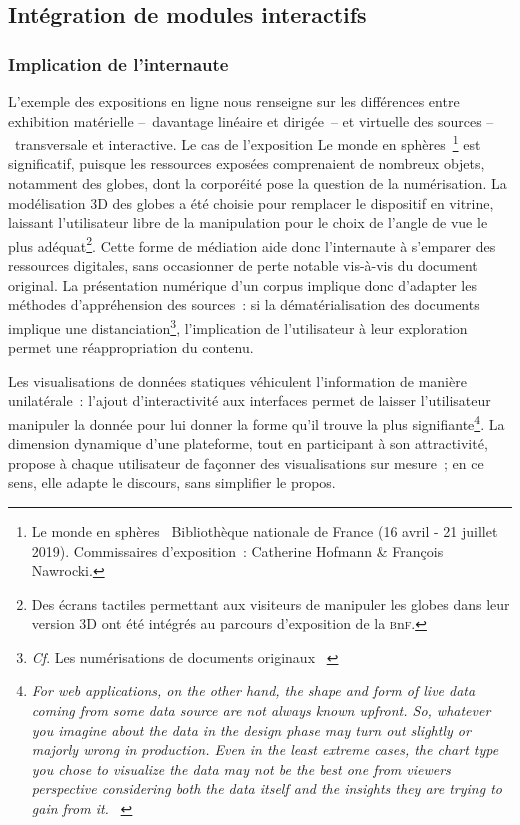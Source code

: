\documentclass[a4paper,12pt,twoside]{book}
\newcommand{\eng}{\emph}
\newcommand{\g}[1]{\og#1~\fg}
\begin{document}
		\subsection{Intégration de modules interactifs}
			\subsubsection{Implication de l'internaute}
L'exemple des expositions en ligne nous renseigne sur les différences entre exhibition matérielle –~davantage linéaire et dirigée~– et virtuelle des sources –~transversale et interactive. Le cas de l'exposition \g{Le monde en sphères}\footnote{\g{Le monde en sphères} Bibliothèque nationale de France (16 avril - 21 juillet 2019). Commissaires d'exposition~: Catherine Hofmann \& François Nawrocki.} est significatif, puisque les ressources exposées comprenaient de nombreux objets, notamment des globes, dont la corporéité pose la question de la numérisation. La modélisation 3D des globes a été choisie pour remplacer le dispositif en vitrine, laissant l'utilisateur libre de la manipulation pour le choix de l'angle de vue le plus adéquat\footnote{Des écrans tactiles permettant aux visiteurs de manipuler les globes dans leur version 3D ont été intégrés au parcours d'exposition de la \textsc{b}n\textsc{f}.}. Cette forme de médiation aide donc l'internaute à s'emparer des ressources digitales, sans occasionner de perte notable vis-à-vis du document original. La présentation numérique d'un corpus implique donc d'adapter les méthodes d'appréhension des sources~: si la dématérialisation des documents implique une distanciation\footnote{\emph{Cf}. \g{Les numérisations de documents originaux} \cite{bertrandHistorienMedievistePratique2007}}, l'implication de l'utilisateur à leur exploration permet une réappropriation du contenu.

Les visualisations de données statiques véhiculent l'information de manière unilatérale~: l'ajout d'interactivité aux interfaces permet de laisser l'utilisateur manipuler la donnée pour lui donner la forme qu'il trouve la plus signifiante\footnote{\g{\eng{For web applications, on the other hand, the shape and form of live data coming from some data source are not always known upfront. So, whatever you imagine about the data in the design phase may turn out slightly or majorly wrong in production. Even in the least extreme cases, the chart type you chose to visualize the data may not be the best one from viewers perspective considering both the data itself and the insights they are trying to gain from it.}} \cite{LetViewersChange2018}}. La dimension dynamique d'une plateforme, tout en participant à son attractivité, propose à chaque utilisateur de façonner des visualisations sur mesure~; en ce sens, elle adapte le discours, sans simplifier le propos.
\end{document}
